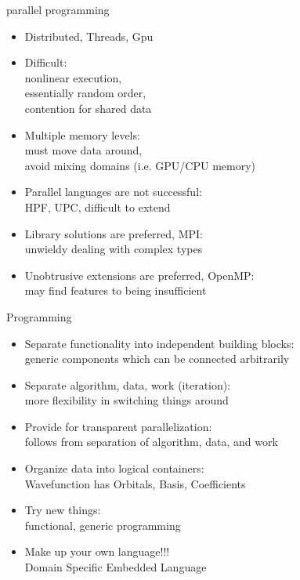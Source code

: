 \documentclass{beamer}
\begin{document}
\begin{frame}{parallel programming}
  \begin{itemize}
  \item Distributed, Threads, Gpu
  \item Difficult:\\
    nonlinear execution,\\
    essentially random order,\\
    contention for shared data
  \item  Multiple memory levels:\\
    must move data around,\\
    avoid mixing domains (i.e. GPU/CPU memory)
  \item Parallel languages are not successful:\\
    HPF, UPC, difficult to extend
  \item Library solutions are preferred, MPI:\\
    unwieldy dealing with complex types
  \item Unobtrusive extensions are preferred, OpenMP:\\
    may find features to being insufficient
  \end{itemize}
\end{frame}

\begin{frame}{ Programming}
  \begin{itemize}
  \item Separate functionality into independent building blocks:\\
    generic components which can be connected arbitrarily
  \item Separate algorithm, data, work (iteration):\\
    more flexibility in switching things around
  \item Provide for transparent parallelization: \\
    follows from separation of algorithm, data, and work
  \item Organize data into logical containers:\\
    Wavefunction has Orbitals, Basis, Coefficients
  \item Try new things: \\
    functional, generic programming
  \item Make up your own language!!!\\
    Domain Specific Embedded Language
  \end{itemize}
\end{frame}
\end{document}
